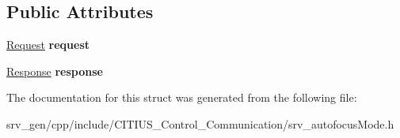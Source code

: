 \subsection*{\-Public \-Attributes}
\begin{DoxyCompactItemize}
\item 
\hypertarget{struct_c_i_t_i_u_s___control___communication_1_1srv__autofocus_mode_a2a0148063b93d60c27c73816a8e9f6f6}{\hyperlink{struct_c_i_t_i_u_s___control___communication_1_1srv__autofocus_mode_request__}{\-Request} {\bfseries request}}\label{struct_c_i_t_i_u_s___control___communication_1_1srv__autofocus_mode_a2a0148063b93d60c27c73816a8e9f6f6}

\item 
\hypertarget{struct_c_i_t_i_u_s___control___communication_1_1srv__autofocus_mode_aae3519fdb47e72e062e72164f71b877a}{\hyperlink{struct_c_i_t_i_u_s___control___communication_1_1srv__autofocus_mode_response__}{\-Response} {\bfseries response}}\label{struct_c_i_t_i_u_s___control___communication_1_1srv__autofocus_mode_aae3519fdb47e72e062e72164f71b877a}

\end{DoxyCompactItemize}


\-The documentation for this struct was generated from the following file\-:\begin{DoxyCompactItemize}
\item 
srv\-\_\-gen/cpp/include/\-C\-I\-T\-I\-U\-S\-\_\-\-Control\-\_\-\-Communication/srv\-\_\-autofocus\-Mode.\-h\end{DoxyCompactItemize}
